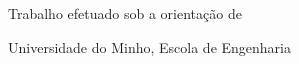 \begin{titlepage}

\hbox{\thelogo}

\vspace*{25mm}
\begin{center}
    {\huge\bfseries \thetitleA}
    \vspace{3mm}
    {\huge\bfseries \thetitleB}
    \vspace{3mm}
    {\huge\bfseries \thetitleC}
\end{center}

\vspace{25mm}
\begin{center}
    {\Large \themasters}
\end{center}

\vspace{20mm}
\begin{center}
    {\large \theauthor}
\end{center}

\vspace{30mm}
\begin{center}
    {\footnotesize Trabalho efetuado sob a orientação de\\
    \vspace{2mm}
    \textbf{\thesupervisor}}
\end{center}

\vfill
\vspace{15mm}
\begin{center}
    {\large Universidade do Minho, Escola de Engenharia}
    \vspace{3mm}
    {\large \myear}
\end{center}

\end{titlepage}

\newpage
\thispagestyle{empty}
\mbox{} 